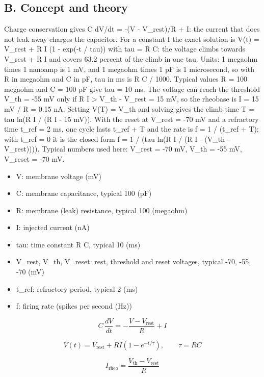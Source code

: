 \documentclass[11pt,a4paper]{article}
\begin{document}
\subsection*{B. Concept and theory}
Charge conservation gives C dV/dt = -(V - V\_rest)/R + I: the current that does not leak away charges the capacitor. For a constant I the exact solution is V(t) = V\_rest + R I (1 - exp(-t / tau)) with tau = R C: the voltage climbs towards V\_rest + R I and covers 63.2 percent of the climb in one tau. Units: 1 megaohm times 1 nanoamp is 1 mV, and 1 megaohm times 1 pF is 1 microsecond, so with R in megaohm and C in pF, tau in ms is R C / 1000. Typical values R = 100 megaohm and C = 100 pF give tau = 10 ms. The voltage can reach the threshold V\_th = -55 mV only if R I \textgreater{} V\_th - V\_rest = 15 mV, so the rheobase is I = 15 mV / R = 0.15 nA. Setting V(T) = V\_th and solving gives the climb time T = tau ln(R I / (R I - 15 mV)). With the reset at V\_rest = -70 mV and a refractory time t\_ref = 2 ms, one cycle lasts t\_ref + T and the rate is f = 1 / (t\_ref + T); with t\_ref = 0 it is the closed form f = 1 / (tau ln(R I / (R I - (V\_th - V\_rest)))). Typical numbers used here: V\_rest = -70 mV, V\_th = -55 mV, V\_reset = -70 mV.

\begin{itemize}[nosep]
\item V: membrane voltage (mV)
\item C: membrane capacitance, typical 100 (pF)
\item R: membrane (leak) resistance, typical 100 (megaohm)
\item I: injected current (nA)
\item tau: time constant R C, typical 10 (ms)
\item V\_rest, V\_th, V\_reset: rest, threshold and reset voltages, typical -70, -55, -70 (mV)
\item t\_ref: refractory period, typical 2 (ms)
\item f: firing rate (spikes per second (Hz))
\end{itemize}

\begin{equation*}
C\,\frac{dV}{dt}=-\frac{V-V_{\mathrm{rest}}}{R}+I
\end{equation*}

\begin{equation*}
V(t)=V_{\mathrm{rest}}+R I\left(1-e^{-t/\tau}\right),\qquad \tau=RC
\end{equation*}

\begin{equation*}
I_{\mathrm{rheo}}=\frac{V_{\mathrm{th}}-V_{\mathrm{rest}}}{R}
\end{equation*}
\end{document}
